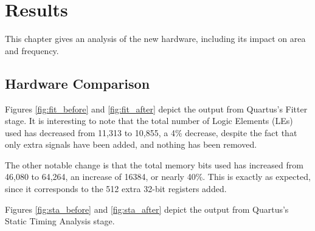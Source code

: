 \chapter{Results}
\label{cha:results}
This chapter gives an analysis of the new hardware, including its impact on area and frequency.

\section{Hardware Comparison}
Figures \ref{fig:fit_before} and \ref{fig:fit_after} depict the output from Quartus's Fitter stage. It is interesting to note that the total number of Logic Elements (LEs) used has decreased from 11,313 to 10,855, a 4\% decrease, despite the fact that only extra signals have been added, and nothing has been removed.

The other notable change is that the total memory bits used has increased from 46,080 to 64,264, an increase of 16384, or nearly 40\%. This is exactly as expected, since it corresponds to the 512 extra 32-bit registers added.

Figures \ref{fig:sta_before} and \ref{fig:sta_after} depict the output from Quartus's Static Timing Analysis stage.

